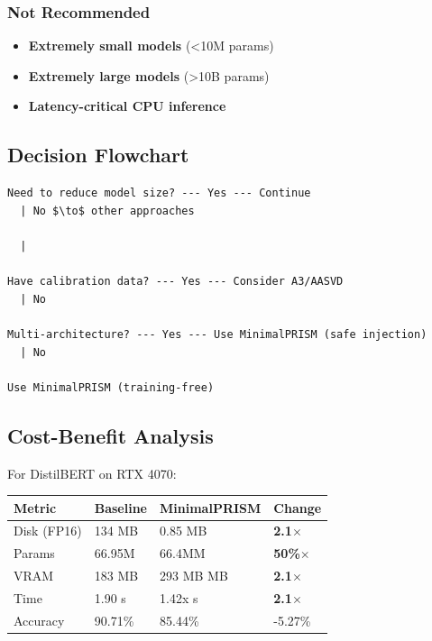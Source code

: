 \subsubsection{Not Recommended}

\begin{itemize}
\item \textbf{Extremely small models} (<10M params)
\item \textbf{Extremely large models} (>10B params)
\item \textbf{Latency-critical CPU inference}

\end{itemize}
\subsection{Decision Flowchart}

\begin{lstlisting}
Need to reduce model size? --- Yes --- Continue
  | No $\to$ other approaches

  |
   
Have calibration data? --- Yes --- Consider A3/AASVD
  | No
   
Multi-architecture? --- Yes --- Use MinimalPRISM (safe injection)
  | No
   
Use MinimalPRISM (training-free)
\end{lstlisting}

\subsection{Cost-Benefit Analysis}

For DistilBERT on RTX 4070:

\begin{table}[H]
\centering
\small
\begin{tabular}{llll}
\toprule
\textbf{Metric} & \textbf{Baseline} & \textbf{MinimalPRISM} & \textbf{Change} \\
\midrule
Disk (FP16) & 134 MB & 0.85 MB & \textbf{2.1$\times$} \\
Params & 66.95M & 66.4MM & \textbf{50\%$\times$} \\
VRAM & 183 MB & 293 MB MB & \textbf{2.1$\times$} \\
Time & 1.90 s & 1.42x s & \textbf{2.1$\times$} \\
Accuracy & 90.71\% & 85.44\% & -5.27\% \\
\bottomrule
\end{tabular}
\end{table}


